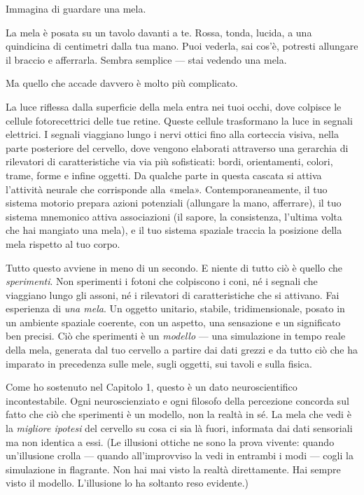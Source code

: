 \documentclass[11pt, twoside, openright]{book}
\begin{document}
Immagina di guardare una mela.

La mela è posata su un tavolo davanti a te. Rossa, tonda, lucida, a una quindicina di centimetri dalla tua mano. Puoi vederla, sai cos'è, potresti allungare il braccio e afferrarla. Sembra semplice --- stai vedendo una mela.

Ma quello che accade davvero è molto più complicato.

La luce riflessa dalla superficie della mela entra nei tuoi occhi, dove colpisce le cellule fotorecettrici delle tue retine. Queste cellule trasformano la luce in segnali elettrici. I segnali viaggiano lungo i nervi ottici fino alla corteccia visiva, nella parte posteriore del cervello, dove vengono elaborati attraverso una gerarchia di rilevatori di caratteristiche via via più sofisticati: bordi, orientamenti, colori, trame, forme e infine oggetti. Da qualche parte in questa cascata si attiva l'attività neurale che corrisponde alla «mela». Contemporaneamente, il tuo sistema motorio prepara azioni potenziali (allungare la mano, afferrare), il tuo sistema mnemonico attiva associazioni (il sapore, la consistenza, l'ultima volta che hai mangiato una mela), e il tuo sistema spaziale traccia la posizione della mela rispetto al tuo corpo.

Tutto questo avviene in meno di un secondo. E niente di tutto ciò è quello che \textit{sperimenti}. Non sperimenti i fotoni che colpiscono i coni, né i segnali che viaggiano lungo gli assoni, né i rilevatori di caratteristiche che si attivano. Fai esperienza di \textit{una mela}. Un oggetto unitario, stabile, tridimensionale, posato in un ambiente spaziale coerente, con un aspetto, una sensazione e un significato ben precisi. Ciò che sperimenti è un \textit{modello} --- una simulazione in tempo reale della mela, generata dal tuo cervello a partire dai dati grezzi e da tutto ciò che ha imparato in precedenza sulle mele, sugli oggetti, sui tavoli e sulla fisica.

Come ho sostenuto nel Capitolo 1, questo è un dato neuroscientifico incontestabile. Ogni neuroscienziato e ogni filosofo della percezione concorda sul fatto che ciò che sperimenti è un modello, non la realtà in sé. La mela che vedi è la \textit{migliore ipotesi} del cervello su cosa ci sia là fuori, informata dai dati sensoriali ma non identica a essi. (Le illusioni ottiche ne sono la prova vivente: quando un'illusione crolla --- quando all'improvviso la vedi in entrambi i modi --- cogli la simulazione in flagrante. Non hai mai visto la realtà direttamente. Hai sempre visto il modello. L'illusione lo ha soltanto reso evidente.)
\end{document}
